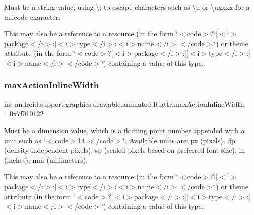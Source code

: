 Must be a string value, using \textquotesingle{}\textbackslash{};\textquotesingle{} to escape characters such as \textquotesingle{}\textbackslash{}n\textquotesingle{} or \textquotesingle{}\textbackslash{}uxxxx\textquotesingle{} for a unicode character. 

This may also be a reference to a resource (in the form \char`\"{}$<$code$>$@\mbox{[}$<$i$>$package$<$/i$>$\+:\mbox{]}$<$i$>$type$<$/i$>$\+:$<$i$>$name$<$/i$>$$<$/code$>$\char`\"{}) or theme attribute (in the form \char`\"{}$<$code$>$?\mbox{[}$<$i$>$package$<$/i$>$\+:\mbox{]}\mbox{[}$<$i$>$type$<$/i$>$\+:\mbox{]}$<$i$>$name$<$/i$>$$<$/code$>$\char`\"{}) containing a value of this type. \mbox{\label{classandroid_1_1support_1_1graphics_1_1drawable_1_1animated_1_1R_1_1attr_a9ff7c1b839ba259118ab593eeed60580}} 
\subsubsection{\texorpdfstring{max\+Action\+Inline\+Width}{maxActionInlineWidth}}
{\footnotesize\ttfamily int android.\+support.\+graphics.\+drawable.\+animated.\+R.\+attr.\+max\+Action\+Inline\+Width =0x7f010122\hspace{0.3cm}{\ttfamily [static]}}

Must be a dimension value, which is a floating point number appended with a unit such as \char`\"{}$<$code$>$14.\+5sp$<$/code$>$\char`\"{}. Available units are\+: px (pixels), dp (density-\/independent pixels), sp (scaled pixels based on preferred font size), in (inches), mm (millimeters). 

This may also be a reference to a resource (in the form \char`\"{}$<$code$>$@\mbox{[}$<$i$>$package$<$/i$>$\+:\mbox{]}$<$i$>$type$<$/i$>$\+:$<$i$>$name$<$/i$>$$<$/code$>$\char`\"{}) or theme attribute (in the form \char`\"{}$<$code$>$?\mbox{[}$<$i$>$package$<$/i$>$\+:\mbox{]}\mbox{[}$<$i$>$type$<$/i$>$\+:\mbox{]}$<$i$>$name$<$/i$>$$<$/code$>$\char`\"{}) containing a value of this type. \mbox{\label{classandroid_1_1support_1_1graphics_1_1drawable_1_1animated_1_1R_1_1attr_aae5ab9c6281c13daf9438b37f5f64449}} 
